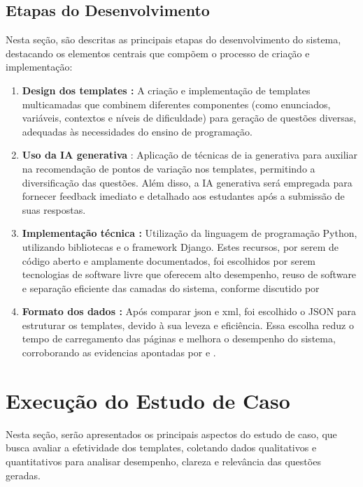 \subsection{Etapas do Desenvolvimento}
Nesta seção, são descritas as principais etapas do desenvolvimento do sistema, destacando os elementos centrais que compõem o processo de criação e implementação: 

\begin{enumerate}[label=\textbf{\alph*)}]
    \item \textbf{Design dos templates :}  A criação e implementação de templates multicamadas que combinem diferentes componentes (como enunciados, variáveis, contextos e níveis de dificuldade) para geração de questões diversas, adequadas às necessidades do ensino de programação.
    \item \textbf{Uso da IA generativa} : Aplicação de técnicas de \gls{ia} generativa para auxiliar na recomendação de pontos de variação nos templates, permitindo a diversificação das questões. Além disso, a IA generativa será empregada para fornecer feedback imediato e detalhado aos estudantes após a submissão de suas respostas.
    \item \textbf{Implementação técnica :}  Utilização da linguagem de programação Python, utilizando bibliotecas e o framework Django. Estes recursos, por serem de código aberto e amplamente documentados, foi escolhidos por serem tecnologias de software livre que oferecem alto desempenho, reuso de software e separação eficiente das camadas do sistema, conforme discutido por  \parencite{rubio2017}
    \item \textbf{Formato dos dados :}  Após comparar \gls{json} e \gls{xml}, foi escolhido o JSON para estruturar os templates, devido à sua leveza e eficiência. Essa escolha reduz o tempo de carregamento das páginas e melhora o desempenho do sistema, corroborando as evidencias apontadas por  \parencite{goyal2017} e \parencite{wang2011} .
\end{enumerate}

\section{Execução do Estudo de Caso}

Nesta seção, serão apresentados os principais aspectos do estudo de caso, que busca avaliar a efetividade dos templates, coletando dados qualitativos e quantitativos para analisar desempenho, clareza e relevância das questões geradas. 

